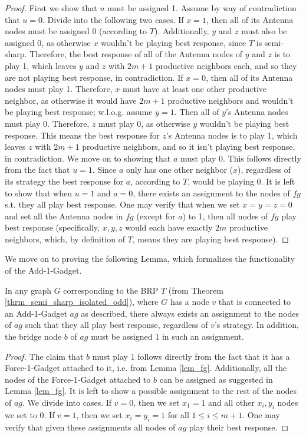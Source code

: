 \documentclass[runningheads]{llncs}
\begin{document}
\begin{proof}
First we show that $u$ must be assigned 1. Assume by way of contradiction that $u=0$. Divide into the following two cases.
If $x=1$, then all of its Antenna nodes must be assigned 0 (according to $T$). Additionally, $y$ and $z$ must also be assigned 0, as otherwise $x$ wouldn't be playing best response, since $T$ is semi-sharp. Therefore, the best response of all of the Antenna nodes of $y$ and $z$ is to play 1, which leaves $y$ and $z$ with $2m+1$ productive neighbors each, and so they are not playing best response, in contradiction.
If $x=0$, then all of its Antenna nodes must play 1. Therefore, $x$ must have at least one other productive neighbor, as otherwise it would have $2m+1$ productive neighbors and wouldn't be playing best response; w.l.o.g. assume $y=1$. Then all of $y$'s Antenna nodes must play 0. Therefore, $z$ must play 0, as otherwise $y$ wouldn't be playing best response. This means the best response for $z$'s Antenna nodes is to play 1, which leaves $z$ with $2m+1$ productive neighbors, and so it isn't playing best response, in contradiction.
We move on to showing that $a$ must play 0. This follows directly from the fact that $u=1$. Since $a$ only has one other neighbor ($x$), regardless of its strategy the best response for $a$, according to $T$, would be playing 0.
It is left to show that when $u=1$ and $a=0$, there exists an assignment to the nodes of $fg$ s.t. they all play best response. One may verify that when we set $x=y=z=0$ and set all the Antenna nodes in $fg$ (except for $a$) to 1, then all nodes of $fg$ play best response (specifically, $x,y,z$ would each have exactly $2m$ productive neighbors, which, by definition of $T$, means they are playing best response).
\end{proof}

We move on to proving the following Lemma, which formalizes the functionality of the Add-1-Gadget.

\begin{lemma}
\label{lem_ag}
In any graph $G$ corresponding to the BRP $T$ (from Theorem \ref{thrm_semi_sharp_isolated_odd}), where $G$ has a node $v$ that is connected to an Add-1-Gadget $ag$ as described, there always exists an assignment to the nodes of $ag$ such that they all play best response, regardless of $v$'s strategy. In addition, the bridge node $b$ of $ag$ must be assigned 1 in such an assignment.
\end{lemma}

\begin{proof}
The claim that $b$ must play 1 follows directly from the fact that it has a Force-1-Gadget attached to it, i.e. from Lemma \ref{lem_fg}. Additionally, all the nodes of the Force-1-Gadget attached to $b$ can be assigned as suggested in Lemma \ref{lem_fg}. It is left to show a possible assignment to the rest of the nodes of $ag$. We divide into cases.
If $v=0$, then we set $x_1=1$ and all other $x_i,y_i$ nodes we set to 0.
If $v=1$, then we set $x_i=y_i=1$ for all $1\leq i \leq m+1$. One may verify that given these assignments all nodes of $ag$ play their best response.
\end{proof}
\end{document}
